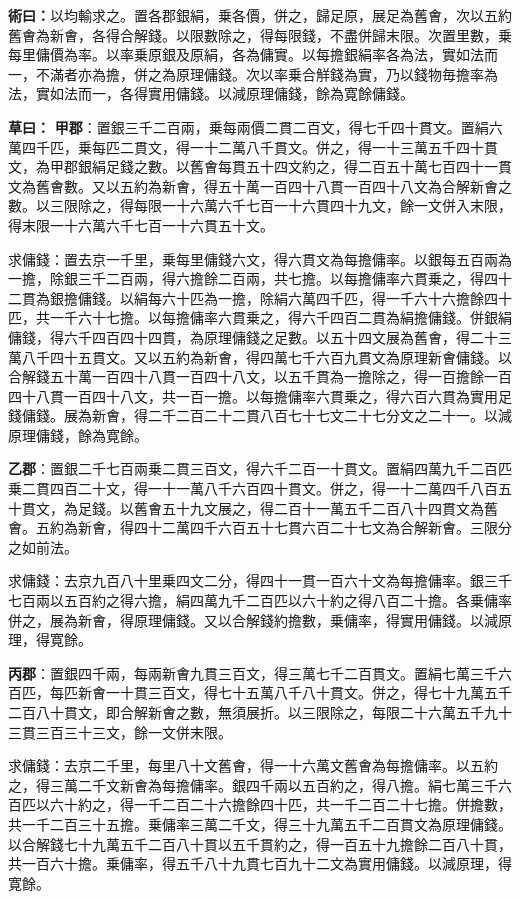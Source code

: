 \documentclass[11pt,a4paper]{article}
\newcommand{\Method}[1]{\par\noindent\textbf{\color{methodcolor}術曰：}#1\par}
\newcommand{\Working}[1]{\par\noindent\textbf{草曰：}#1\par}
\begin{document}
\Method{以均輸求之。置各郡銀絹，乗各價，併之，歸足原，展足為舊㑹，次以五約舊㑹為新㑹，各得合解錢。以限數除之，得每限錢，不盡併歸末限。次置里數，乗每里傭價為率。以率乗原銀及原絹，各為傭實。以每擔銀絹率各為法，實如法而一，不滿者亦為擔，併之為原理傭錢。次以率乗合觧錢為實，乃以錢物毎擔率為法，實如法而一，各得實用傭錢。以減原理傭錢，餘為寛餘傭錢。}

\Working{
\textbf{甲郡}：置銀三千二百兩，乗每兩價二貫二百文，得七千四十貫文。置絹六萬四千匹，乗每匹二貫文，得一十二萬八千貫文。併之，得一十三萬五千四十貫文，為甲郡銀絹足錢之數。以舊㑹每貫五十四文約之，得二百五十萬七百四十一貫文為舊㑹數。又以五約為新㑹，得五十萬一百四十八貫一百四十八文為合解新㑹之數。以三限除之，得每限一十六萬六千七百一十六貫四十九文，餘一文併入末限，得末限一十六萬六千七百一十六貫五十文。

求傭錢：置去京一千里，乗每里傭錢六文，得六貫文為每擔傭率。以銀每五百兩為一擔，除銀三千二百兩，得六擔餘二百兩，共七擔。以每擔傭率六貫乗之，得四十二貫為銀擔傭錢。以絹每六十匹為一擔，除絹六萬四千匹，得一千六十六擔餘四十匹，共一千六十七擔。以每擔傭率六貫乗之，得六千四百二貫為絹擔傭錢。併銀絹傭錢，得六千四百四十四貫，為原理傭錢之足數。以五十四文展為舊㑹，得二十三萬八千四十五貫文。又以五約為新㑹，得四萬七千六百九貫文為原理新㑹傭錢。以合解錢五十萬一百四十八貫一百四十八文，以五千貫為一擔除之，得一百擔餘一百四十八貫一百四十八文，共一百一擔。以每擔傭率六貫乗之，得六百六貫為實用足錢傭錢。展為新㑹，得二千二百二十二貫八百七十七文二十七分文之二十一。以減原理傭錢，餘為寛餘。

\textbf{乙郡}：置銀二千七百兩乗二貫三百文，得六千二百一十貫文。置絹四萬九千二百匹乗二貫四百二十文，得一十一萬八千六百四十貫文。併之，得一十二萬四千八百五十貫文，為足錢。以舊㑹五十九文展之，得二百十一萬五千二百八十四貫文為舊㑹。五約為新㑹，得四十二萬四千六百五十七貫六百二十七文為合解新㑹。三限分之如前法。

求傭錢：去京九百八十里乗四文二分，得四十一貫一百六十文為每擔傭率。銀三千七百兩以五百約之得六擔，絹四萬九千二百匹以六十約之得八百二十擔。各乗傭率併之，展為新㑹，得原理傭錢。又以合解錢約擔數，乗傭率，得實用傭錢。以減原理，得寛餘。

\textbf{丙郡}：置銀四千兩，每兩新㑹九貫三百文，得三萬七千二百貫文。置絹七萬三千六百匹，每匹新㑹一十貫三百文，得七十五萬八千八十貫文。併之，得七十九萬五千二百八十貫文，即合解新㑹之數，無須展折。以三限除之，每限二十六萬五千九十三貫三百三十三文，餘一文併末限。

求傭錢：去京二千里，每里八十文舊㑹，得一十六萬文舊㑹為每擔傭率。以五約之，得三萬二千文新㑹為每擔傭率。銀四千兩以五百約之，得八擔。絹七萬三千六百匹以六十約之，得一千二百二十六擔餘四十匹，共一千二百二十七擔。併擔數，共一千二百三十五擔。乗傭率三萬二千文，得三十九萬五千二百貫文為原理傭錢。以合解錢七十九萬五千二百八十貫以五千貫約之，得一百五十九擔餘二百八十貫，共一百六十擔。乗傭率，得五千八十九貫七百九十二文為實用傭錢。以減原理，得寛餘。

}
\end{document}
